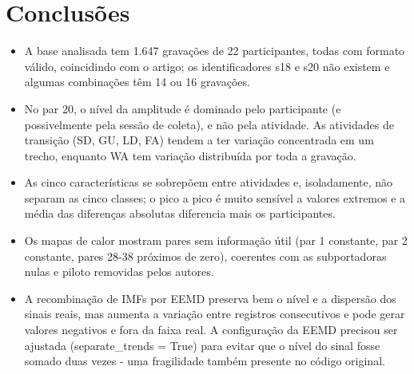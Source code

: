 \section{Conclusões}

\begin{itemize}
    \item A base analisada tem 1.647 gravações de 22 participantes, todas com formato válido, coincidindo com o artigo; os identificadores s18 e s20 não existem e algumas combinações têm 14 ou 16 gravações.
    \item No par 20, o nível da amplitude é dominado pelo participante (e possivelmente pela sessão de coleta), e não pela atividade. As atividades de transição (SD, GU, LD, FA) tendem a ter variação concentrada em um trecho, enquanto WA tem variação distribuída por toda a gravação.
    \item As cinco características se sobrepõem entre atividades e, isoladamente, não separam as cinco classes; o pico a pico é muito sensível a valores extremos e a média das diferenças absolutas diferencia mais os participantes.
    \item Os mapas de calor mostram pares sem informação útil (par 1 constante, par 2 constante, pares 28-38 próximos de zero), coerentes com as subportadoras nulas e piloto removidas pelos autores.
    \item A recombinação de IMFs por EEMD preserva bem o nível e a dispersão dos sinais reais, mas aumenta a variação entre registros consecutivos e pode gerar valores negativos e fora da faixa real. A configuração da EEMD precisou ser ajustada (separate\_trends = True) para evitar que o nível do sinal fosse somado duas vezes - uma fragilidade também presente no código original.
\end{itemize}
